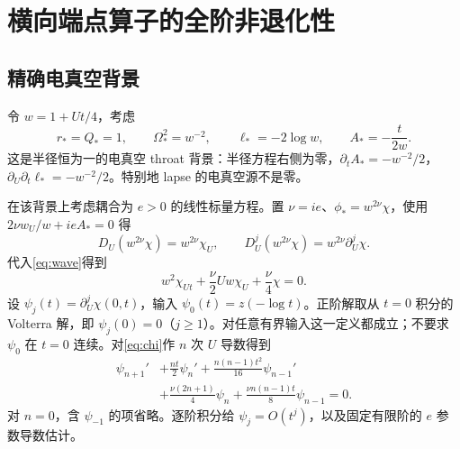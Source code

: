 \section{横向端点算子的全阶非退化性}\label{sec:linear}
\subsection{精确电真空背景}
令 $w=1+Ut/4$，考虑
\begin{equation}\label{eq:throat}
r_*=Q_*=1,\qquad\Omega_*^2=w^{-2},\qquad
\ell_*=-2\log w,\qquad A_*=-\frac{t}{2w}.
\end{equation}
这是半径恒为一的电真空 throat 背景：半径方程右侧为零，$\partial_tA_*=-w^{-2}/2$，$\partial_U\partial_t\ell_*=-w^{-2}/2$。特别地 lapse 的电真空源不是零。

在该背景上考虑耦合为 $e>0$ 的线性标量方程。置 $\nu=ie$、$\phi_*=w^{2\nu}\chi$，使用 $2\nu w_U/w+ieA_*=0$ 得
\[
D_U(w^{2\nu}\chi)=w^{2\nu}\chi_U,
\qquad D_U^j(w^{2\nu}\chi)=w^{2\nu}\partial_U^j\chi.
\]
代入\eqref{eq:wave}得到
\begin{equation}\label{eq:chi}
w^2\chi_{Ut}+\frac\nu2 Uw\chi_U+\frac\nu4\chi=0.
\end{equation}
设 $\psi_j(t)=\partial_U^j\chi(0,t)$，输入 $\psi_0(t)=z(-\log t)$。正阶解取从 $t=0$ 积分的 Volterra 解，即 $\psi_j(0)=0$（$j\ge1$）。对任意有界输入这一定义都成立；不要求 $\psi_0$ 在 $t=0$ 连续。对\eqref{eq:chi}作 $n$ 次 $U$ 导数得到
\begin{equation}\label{eq:psi-rec}
\begin{aligned}
\psi_{n+1}'&+\frac{nt}{2}\psi_n'
+\frac{n(n-1)t^2}{16}\psi_{n-1}'\\
&+\frac{\nu(2n+1)}4\psi_n
+\frac{\nu n(n-1)t}{8}\psi_{n-1}=0.
\end{aligned}
\end{equation}
对 $n=0$，含 $\psi_{-1}$ 的项省略。逐阶积分给 $\psi_j=O(t^j)$，以及固定有限阶的 $e$ 参数导数估计。

